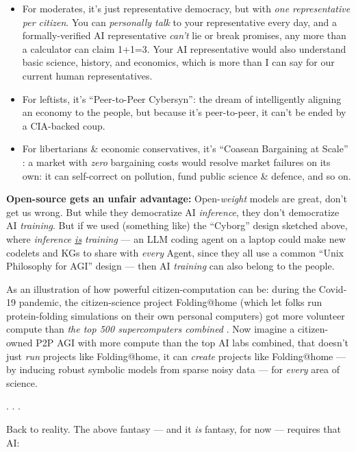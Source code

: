 \documentclass[11pt]{article}
\begin{document}
\begin{itemize}
    \item For moderates, it's just representative democracy, but with \textit{one representative per citizen}. You can \textit{personally talk} to your representative every day, and a formally-verified AI representative \textit{can't} lie or break promises, any more than a calculator can claim 1+1=3. Your AI representative would also understand basic science, history, and economics, which is more than I can say for our current human representatives.
    \item For leftists, it's ``Peer-to-Peer Cybersyn'': the dream of intelligently aligning an economy to the people, but because it's peer-to-peer, it can't be ended by a CIA-backed coup.
    \item For libertarians \& economic conservatives, it's ``Coasean Bargaining at Scale'' \citep{krier_coasean}: a market with \textit{zero} bargaining costs would resolve market failures on its own: it can self-correct on pollution, fund public science \& defence, and so on.
\end{itemize}

\textbf{Open-source gets an unfair advantage:} Open-\textit{weight} models are great, don't get us wrong. But while they democratize AI \textit{inference}, they don't democratize AI \textit{training}. But if we used (something like) the ``Cyborg'' design sketched above, where \textit{inference \uline{is} training} — an LLM coding agent on a laptop could make new codelets and KGs to share with \textit{every} Agent, since they all use a common ``Unix Philosophy for AGI'' design — then AI \textit{training} can also belong to the people.

As an illustration of how powerful citizen-computation can be: during the Covid-19 pandemic, the citizen-science project Folding@home (which let folks run protein-folding simulations on their own personal computers) got more volunteer compute than \textit{the top 500 supercomputers combined} \citep{folding_at_home}. Now imagine a citizen-owned P2P AGI with more compute than the top AI labs combined, that doesn't just \textit{run} projects like Folding@home, it can \textit{create} projects like Folding@home — by inducing robust symbolic models from sparse noisy data — for \textit{every} area of science.

. . .

Back to reality. The above fantasy — and it \textit{is} fantasy, for now — requires that AI:
\end{document}
